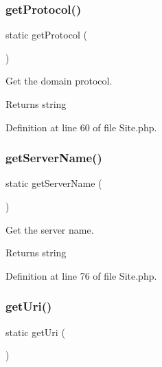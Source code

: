 \subsubsection{\texorpdfstring{get\+Protocol()}{getProtocol()}}
{\footnotesize\ttfamily static get\+Protocol (\begin{DoxyParamCaption}{ }\end{DoxyParamCaption})\hspace{0.3cm}{\ttfamily [static]}}

Get the domain protocol.

\begin{DoxyReturn}{Returns}
string 
\end{DoxyReturn}


Definition at line 60 of file Site.\+php.

\mbox{\label{class_zest_1_1_site_1_1_site_ad690e1e46ca1b9bf7e1edcc19d35cc0b}} 
\subsubsection{\texorpdfstring{get\+Server\+Name()}{getServerName()}}
{\footnotesize\ttfamily static get\+Server\+Name (\begin{DoxyParamCaption}{ }\end{DoxyParamCaption})\hspace{0.3cm}{\ttfamily [static]}}

Get the server name.

\begin{DoxyReturn}{Returns}
string 
\end{DoxyReturn}


Definition at line 76 of file Site.\+php.

\mbox{\label{class_zest_1_1_site_1_1_site_a58ea02df7d1051bed92f73fc3a87772c}} 
\subsubsection{\texorpdfstring{get\+Uri()}{getUri()}}
{\footnotesize\ttfamily static get\+Uri (\begin{DoxyParamCaption}{ }\end{DoxyParamCaption})\hspace{0.3cm}{\ttfamily [static]}}

